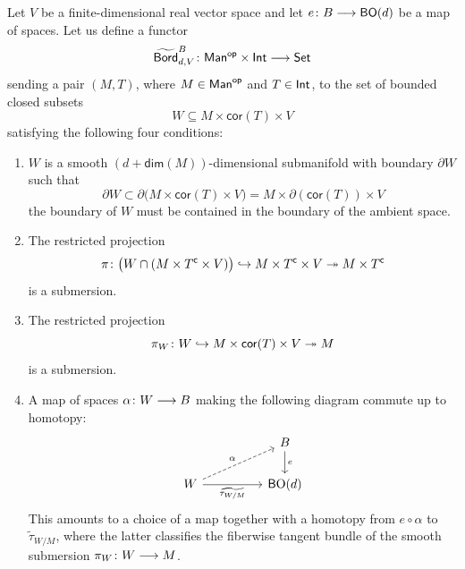 \begin{definition}\label{ch3:: def: bord_d tangential}
    Let $V$ be a finite-dimensional real vector space and let $e\colon B \longrightarrow \mathsf B\mathsf O(d)$ be a map of spaces. Let us define a functor 
    \begin{equation}
    \widetilde{\operatorname{\mathsf{Bord}}}^{B}_{d,V} \colon \mathsf{Man^{\mathsf{op}}}\times \operatorname{\mathsf{Int}} \longrightarrow \operatorname{{\mathsf{Set}}}    
    \end{equation}
    sending a pair $(M,T)$, where $M\in \operatorname{\sf Man}^{\mathsf{op}}$ and $T\in \operatorname{\mathsf{Int}}$, to the set of bounded closed subsets 
    \begin{equation}
    W\subseteq M\times \mathsf{cor}(T) \times V
    \end{equation} 
    satisfying the following four conditions:
    \begin{enumerate}
    \item $W$ is a smooth $(d+\mathsf{dim}(M))$-dimensional submanifold with boundary $\partial W$ such that 
    \begin{equation}
        \partial W \subset \partial \big(M \times \mathsf{cor}(T) \times V\big) = M \times \partial (\mathsf{cor}(T)) \times V   
    \end{equation}
    the boundary of $W$ must be contained in the boundary of the ambient space.
    \item The restricted projection 
    \begin{equation}
        \pi\colon \big(W \cap (M\times T^{\mathsf c} \times V) \big) \hookrightarrow  M \times T^{\mathsf c} \times V \twoheadrightarrow  M \times T^{\mathsf c}
    \end{equation} 
    is a submersion. 
    \item The restricted projection 
    \begin{equation}
    \pi_W\colon W \hookrightarrow M\times \mathsf{cor}(T) \times V \twoheadrightarrow M 
    \end{equation}
    is a submersion.
    \item A map of spaces $\alpha \colon W \longrightarrow B$ making the following diagram commute up to homotopy:
    \begin{equation}
        \begin{tikzcd}[ampersand replacement=\&]
            \&\& B \\
            W \&\& {\BO(d)}
            \arrow["e", from=1-3, to=2-3]
            \arrow["\alpha", dashed, from=2-1, to=1-3]
            \arrow["{\widetilde{\tau_{W/M}}}"', from=2-1, to=2-3]
        \end{tikzcd}
    \end{equation}   
    This amounts to a choice of a map together with a homotopy from $e\circ \alpha$ to $\widetilde{\tau}_{W/M}$, where the latter classifies the fiberwise tangent bundle of the smooth submersion $\pi_W\colon W \longrightarrow M$. 
    \end{enumerate} 


\end{definition}
